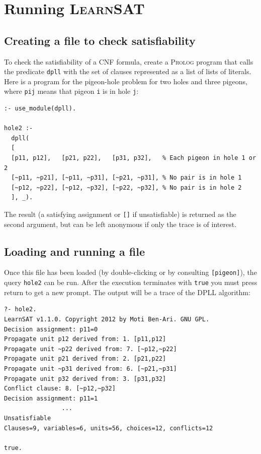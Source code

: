 \documentclass[11pt]{article}
\newcommand*{\p}[1]{\textup{\texttt{#1}}}
\newcommand*{\ls}{\textsc{LearnSAT}}
\newcommand*{\pl}{\textsc{Prolog}}
\begin{document}
\section{Running \ls}

\subsection{Creating a file to check satisfiability}

To check the satisfiability of a CNF formula, create a \pl{} program
that calls the predicate \p{dpll} with the set of clauses represented as
a list of lists of literals. Here is a program for the pigeon-hole
problem for two holes and three pigeons, where \p{pij} means that pigeon
\p{i} is in hole \p{j}:

\begin{verbatim}
:- use_module(dpll).

hole2 :-
  dpll(
  [
  [p11, p12],   [p21, p22],   [p31, p32],   % Each pigeon in hole 1 or 2 
  [~p11, ~p21], [~p11, ~p31], [~p21, ~p31], % No pair is in hole 1
  [~p12, ~p22], [~p12, ~p32], [~p22, ~p32], % No pair is in hole 2
  ], _).
\end{verbatim}

The result (a satisfying assignment or \p{[]} if unsatisfiable) is
returned as the second argument, but can be left anonymous if only
the trace is of interest.

\subsection{Loading and running a file}

Once this file has been loaded (by double-clicking or by consulting
\p{[pigeon]}), the query \p{hole2} can be run. After the execution
terminates with \p{true} you must press return to get a new prompt. The
output will be a trace of the DPLL algorithm:

\begin{verbatim}
?- hole2.
LearnSAT v1.1.0. Copyright 2012 by Moti Ben-Ari. GNU GPL.
Decision assignment: p11=0
Propagate unit p12 derived from: 1. [p11,p12]
Propagate unit ~p22 derived from: 7. [~p12,~p22]
Propagate unit p21 derived from: 2. [p21,p22]
Propagate unit ~p31 derived from: 6. [~p21,~p31]
Propagate unit p32 derived from: 3. [p31,p32]
Conflict clause: 8. [~p12,~p32]
Decision assignment: p11=1
                ...
Unsatisfiable
Clauses=9, variables=6, units=56, choices=12, conflicts=12

true.
\end{verbatim}
\end{document}
